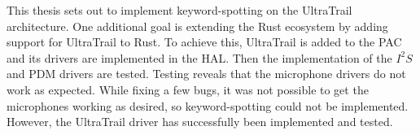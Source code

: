 
This thesis sets out to implement keyword-spotting on the UltraTrail architecture.
One additional goal is extending the Rust ecosystem by adding support for UltraTrail to Rust.
To achieve this, UltraTrail is added to the PAC and its drivers are implemented in the HAL.
Then the implementation of the $I^2S$ and PDM drivers are tested.
Testing reveals that the microphone drivers do not work as expected.
While fixing a few bugs, it was not possible to get the microphones working as
desired, so keyword-spotting could not be implemented.
However, the UltraTrail driver has successfully been implemented and tested.
